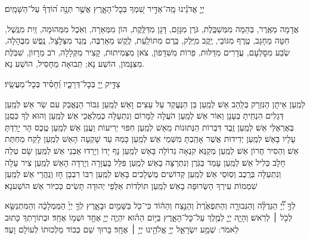 \documentclass[twoside, openany, parskip=half, 11pt]{book}
\begin{document}
יְיָ֤ אֲדֹנֵ֗ינוּ מָֽה־אַדִּ֣יר שִׁ֭מְךָ בְּכׇל־הָאָ֑רֶץ אֲשֶׁ֥ר תְּנָ֥ה ה֝וֹדְךָ֗ עַל־הַשָּׁמָֽיִם׃

אֲדָמָה מֵאֶֽרֶר, בְּהֵמָה מִמְּשַׁכֶּֽלֶת, גֹּרֶן מִגָּזָם, דָּגָן מִדַּלֶּֽקֶת, הוֹן מִמְּאֵרָה, וְאֹֽכֶל מִמְּהוּמָה, זַֽיִת מִנֶּֽשֶׁל, חִטָּה מֵחָגָב, טֶֽרֶף מִגּוֹבַי, יֶֽקֶב מִיֶּֽלֶק, כֶּֽרֶם מִתּוֹלַֹֽעַת, לֶֽקֶשׁ מֵאַרְבֶּה, מֶֽגֶד מִצְּלָצָל, נֶֽפֶשׁ מִבֶּהָלָה, שֹֹֹֽבַע מִסׇּלְעָם, עֲדָרִים מִדַּלּוּת, פֵּרוֹת מִשִּׁדָּפוֹן, צֹאן מִצְּמִיתוּת, קָצִיר מִקְּלָלָה, רֹב מֵרָזוֹן, שִׁבֹּֽלֶת מִצִּנָּמוֹן, הוֹשַׁע נָא; תְּבוּאָה מֵחָסִיל, הוֹשַׁע נָא. 

צַדִּ֣יק יְ֖יָ בְּכׇל־דְּרָכָ֑יו וְ֝חָסִ֗יד בְּכׇל־מַעֲשָֽׂיו׃

לְמַֽעַן אֵיתָן הַנִּזְרַק בְּלַֽהַב אֵשׁ׃ לְמַֽעַן בֵּן הַנֶּעֱקַד עַל עֵצִים וָאֵשׁ׃ לְמַֽעַן גִּבּוֹר הַנֶּאֱבַק עִם שַׂר אֵשׁ׃ לְמַֽעַן דְּגָלִים הִנְחִֽיתָ בְּעָנָן וְאוֹר אֵשׁ׃ לְמַֽעַן הֹעֲלָה לַמָּרוֹם וְנִתְעַלָּה כְּמַלְאֲכֵי אֵשׁ׃ לְמַֽעַן וְהוּא לְךָ כְּסֶֽגֶן בְּאֶרְאֶלֵּי אֵשׁ׃ לְמַֽעַן זֶֽבֶד דִּבְּרוֹת הַנְּתוּנוֹת מֵאֵשׁ לְמַֽעַן חִפּוּי יְרִיעוֹת וַעֲנַן אֵשׁ׃ לְמַֽעַן טֶֽכֶס הָר יָרַֽדְתָּ עָלָיו בָּאֵשׁ׃ לְמַֽעַן יְדִידוּת אֲשֶׁר אָהַֽבְתָּ מִשְּׁמֵי אֵשׁ׃ לְמַֽעַן כָּמַהּ עַד שָׁקְעָה הָאֵשׁ לְמַֽעַן לָקַח מַחְתַּת אֵשׁ׃ וְהֵסִיר חֲרוֹן אֵשׁ׃ לְמַֽעַן מְקַנֵּא קִנְאָה גְדוֹלָה בָּאֵשׁ לְמַֽעַן נָף יָדוֹ וְיָרְדוּ אַבְנֵי אֵשׁ׃ לְמַֽעַן שָׂם טְלֵה חָלָב כְּלִיל אֵשׁ׃ לְמַֽעַן עָמַד בַּגֹּֽרֶן וְנִתְרַצָּה בָאֵשׁ׃ לְמַֽעַן פִּלֵּל בָּעֲזָרָה וְיָרְדָה הָאֵשׁ׃ לְמַֽעַן צִיר עָלָה וְנִתְעַלָּה בְּרֶֽכֶב וְסֽוּסֵי אֵשׁ׃ לְמַֽעַן קְדוֹשִׁים מֻשְׁלָכִים בָּאֵשׁ׃ לְמַֽעַן רִבּוֹ רִבְבָן חָז וְנַֽהֲרֵי אֵשׁ׃
לְמַֽעַן שִׁמְמוֹת עִירְךָ הַשְּׂרוּפָה בָאֵשׁ׃
לְמַֽעַן תּוֹלְדוֹת אַלֻּפֵי יְהוּדָה תָּשִׂים כְּכִיּוֹר אֵשׁ׃ הוֹשַׁענָא׃

לְךָ֣ יְ֠יָ֠ הַגְּדֻלָּ֨ה וְהַגְּבוּרָ֤ה וְהַתִּפְאֶ֙רֶת֙ וְהַנֵּ֣צַח וְהַה֔וֹד כִּי־כֹ֖ל בַּשָּׁמַ֣יִם וּבָאָ֑רֶץ לְךָ֤ יְיָ֙ הַמַּמְלָכָ֔ה וְהַמִּתְנַשֵּׂ֖א לְכֹ֥ל ׀ לְרֹֽאשׁ׃  וְהָיָ֧ה יְיָ֛ לְמֶ֖לֶךְ עַל־כׇּל־הָאָ֑רֶץ בַּיּ֣וֹם הַה֗וּא יִהְיֶ֧ה יְיָ֛ אֶחָ֖ד וּשְׁמ֥וֹ אֶחָֽד׃ וּבְתוֹרָתְךָ כָּתוּב לֵאמֹר: שְׁמַ֖ע יִשְׂרָאֵ֑ל יְיָ֥ אֱלֹהֵ֖ינוּ יְיָ֥ ׀ אֶחָֽד׃ בָּרוּךְ שֵׁם כְּבוֹד מַלְכוּתוֹ לְעוֹלָם וָעֶד׃

\anivho
\end{document}
